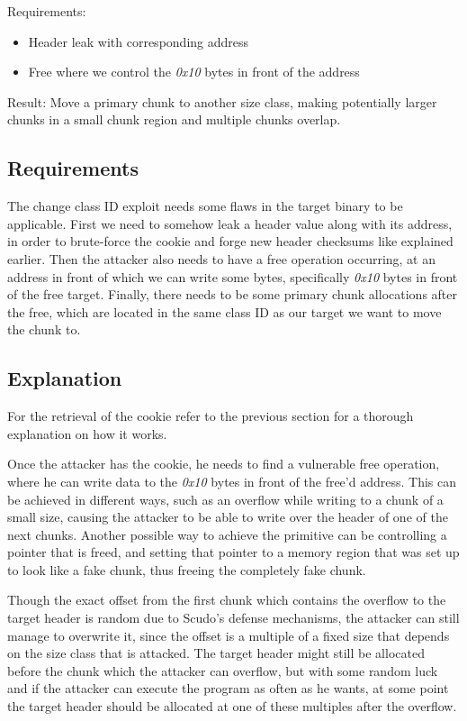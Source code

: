 \documentclass[a4paper,11pt,oneside]{report}
\begin{document}
Requirements:
\begin{itemize}
\item Header leak with corresponding address
\item Free where we control the \emph{0x10} bytes in front of the address
\end{itemize}

Result: Move a primary chunk to another size class, making potentially larger chunks in a
small chunk region and multiple chunks overlap.

\subsection{Requirements}

The change class ID exploit needs some flaws in the target binary to be applicable.  First
we need to somehow leak a header value along with its address, in order to brute-force the
cookie and forge new header checksums like explained earlier. Then the attacker also needs
to have a free operation occurring, at an address in front of which we can write some
bytes, specifically \emph{0x10} bytes in front of the free target. Finally, there needs to
be some primary chunk allocations after the free, which are located in the same class ID
as our target we want to move the chunk to.

\subsection{Explanation}

For the retrieval of the cookie refer to the previous section for a thorough explanation
on how it works.

Once the attacker has the cookie, he needs to find a vulnerable free operation, where he
can write data to the \emph{0x10} bytes in front of the free'd address. 
This can be achieved in different ways, such as an overflow while writing to a chunk of a
small size, causing the attacker to be able to write over the header of one of the next
chunks. Another possible way to achieve the primitive can be controlling a pointer that is
freed, and setting that pointer to a memory region that was set up to look like a fake
chunk, thus freeing the completely fake chunk.

Though the exact offset from the first chunk which contains the overflow
to the target header is random due to Scudo's defense mechanisms, the attacker can still
manage to overwrite it, since the offset is a multiple of a fixed size that depends on the
size class that is attacked. The target header might still be allocated before the chunk
which the attacker can overflow, but with some random luck and if the attacker can execute
the program as often as he wants, at some point the target header should be allocated at
one of these multiples after the overflow.
\end{document}
